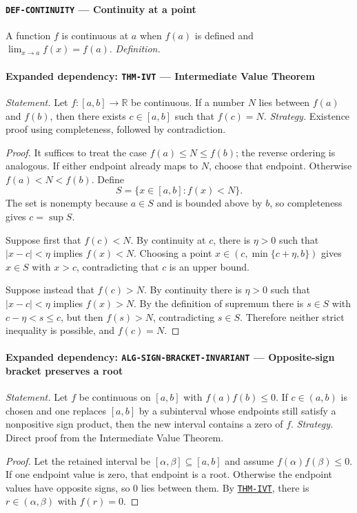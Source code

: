 \documentclass[10pt]{article}
\newcommand{\pidraw}[1]{\begingroup\urlstyle{tt}\nolinkurl{#1}\endgroup}
\newcommand{\pidref}[1]{\hyperref[prf:#1]{\pidraw{#1}}}
\newcommand{\pid}[1]{\pidref{#1}}
\theoremstyle{definition}
\theoremstyle{remark}
\begin{document}
\paragraph{\pidraw{DEF-CONTINUITY} --- Continuity at a point}
A function $f$ is continuous at $a$ when $f(a)$ is defined and $\lim_{x\to a}f(x)=f(a)$.
\textit{Definition.}

\paragraph{Expanded dependency: \pidraw{THM-IVT} --- Intermediate Value Theorem}
\textit{Statement.} Let $f:[a,b]\to\mathbb{R}$ be continuous. If a number $N$ lies between
$f(a)$ and $f(b)$, then there exists $c\in[a,b]$ such that $f(c)=N$.
\textit{Strategy.} Existence proof using completeness, followed by contradiction.
\begin{proof}It suffices to treat the case $f(a)\le N\le f(b)$; the reverse ordering is analogous.
If either endpoint already maps to $N$, choose that endpoint. Otherwise
$f(a)<N<f(b)$. Define
\[
S=\{x\in[a,b]: f(x)<N\}.
\]
The set is nonempty because $a\in S$ and is bounded above by $b$, so completeness
gives $c=\sup S$.

Suppose first that $f(c)<N$. By continuity at $c$, there is $\eta>0$ such that
$|x-c|<\eta$ implies $f(x)<N$. Choosing a point
$x\in(c,\min\{c+\eta,b\})$ gives $x\in S$ with $x>c$, contradicting that $c$
is an upper bound.

Suppose instead that $f(c)>N$. By continuity there is $\eta>0$ such that
$|x-c|<\eta$ implies $f(x)>N$. By the definition of supremum there is
$s\in S$ with $c-\eta<s\le c$, but then $f(s)>N$, contradicting $s\in S$.
Therefore neither strict inequality is possible, and $f(c)=N$.\end{proof}

\paragraph{Expanded dependency: \pidraw{ALG-SIGN-BRACKET-INVARIANT} --- Opposite-sign bracket preserves a root}
\textit{Statement.} Let $f$ be continuous on $[a,b]$ with $f(a)f(b)\le0$. If $c\in(a,b)$ is chosen and one replaces $[a,b]$ by a subinterval whose endpoints still satisfy a nonpositive sign product, then the new interval contains a zero of $f$.
\textit{Strategy.} Direct proof from the Intermediate Value Theorem.
\begin{proof}Let the retained interval be $[\alpha,\beta]\subseteq[a,b]$ and assume
$f(\alpha)f(\beta)\le0$. If one endpoint value is zero, that endpoint is a root.
Otherwise the endpoint values have opposite signs, so $0$ lies between them.
By \pid{THM-IVT}, there is $r\in(\alpha,\beta)$ with $f(r)=0$.\end{proof}
\end{document}
